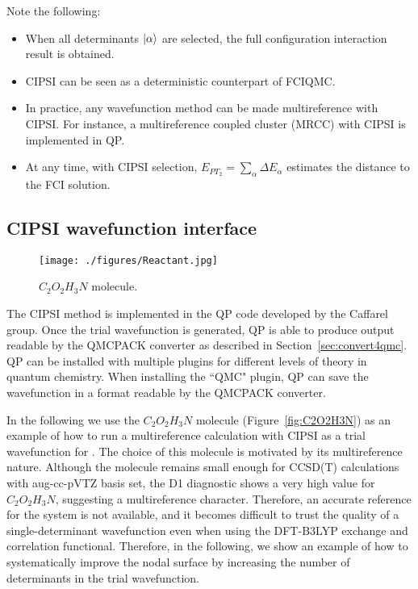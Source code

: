 Note the following:
\begin{itemize}
\item When all determinants $\lvert \alpha \rangle$ are selected, the full configuration interaction result is obtained.
\item CIPSI can be seen as a deterministic counterpart of FCIQMC. 
\item In practice, any wavefunction method can be made multireference with CIPSI. For instance, a multireference coupled cluster (MRCC) with CIPSI is implemented in QP.\cite{Garniron2017-1}
\item At any time, with CIPSI selection, $E_{PT_2}=\sum_\alpha \Delta E_\alpha$ estimates the distance to the FCI solution.
\end{itemize}


\subsection{CIPSI wavefunction interface}
\label{sec:cipsi}


\begin{figure}
\begin{center}
\texttt{[image: ./figures/Reactant.jpg]}
\end{center}
\caption{$C_2O_2H_3N$ molecule.}
\protect{\label{fig:C2O2H3N}}
\end{figure}
The CIPSI method
is implemented in the QP code\cite{QP} developed by the Caffarel group. Once the trial wavefunction is generated, QP is able to produce output readable by the QMCPACK converter as described in Section~\ref{sec:convert4qmc}. QP can be installed with multiple plugins for different levels of theory in quantum chemistry. When installing the ``QMC" plugin, QP can save the wavefunction in a format readable by the QMCPACK converter. 

In the following we use the $C_2O_2H_3N$ molecule (Figure~\ref{fig:C2O2H3N}) as an example of how to run a multireference calculation with CIPSI as a trial wavefunction for \qmcpack. The choice of this molecule is motivated by its multireference nature. Although the molecule remains small enough for CCSD(T) calculations with aug-cc-pVTZ basis set, the D1 diagnostic shows a very high value for  $C_2O_2H_3N$, suggesting a multireference character.  Therefore, an accurate reference for the system is not available, and it becomes difficult to trust the quality of a single-determinant wavefunction even when using the DFT-B3LYP exchange and correlation functional. Therefore, in the following, we show an example of how to systematically improve the nodal surface by increasing the number of determinants in the trial wavefunction.

